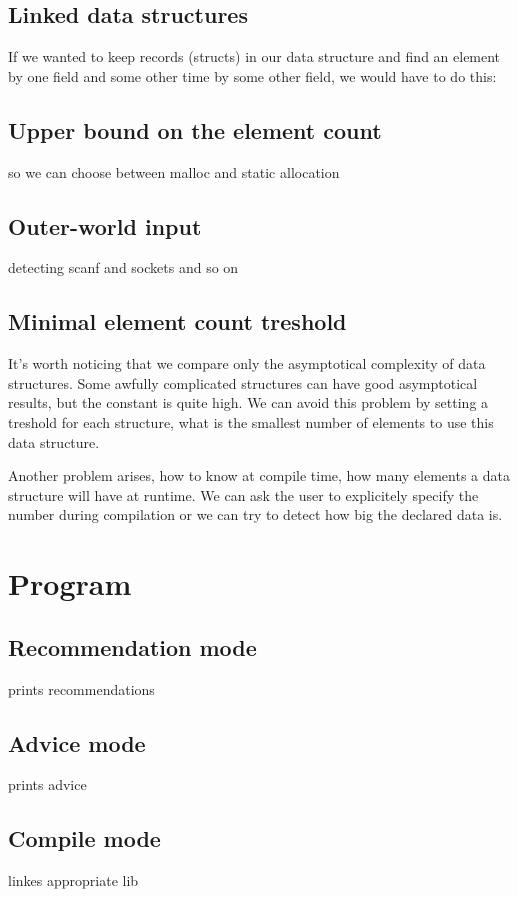 \documentclass[11pt]{article}
\begin{document}
	\subsection{Linked data structures}
		If we wanted to keep records (structs) in our data structure and find an element by one field and some other time by some other field, we would have to do this:
	\subsection{Upper bound on the element count}
		so we can choose between malloc and static allocation
	\subsection{Outer-world input}
		detecting scanf and sockets and so on
	\subsection{Minimal element count treshold}
		It's worth noticing that we compare only the asymptotical complexity of data structures. Some awfully complicated structures can have good asymptotical results, but the constant is quite high. We can avoid this problem by setting a treshold for each structure, what is the smallest number of elements to use this data structure.

		Another problem arises, how to know at compile time, how many elements a data structure will have at runtime. We can ask the user to explicitely specify the number during compilation or we can try to detect how big the declared data is.
\section{Program}
	\subsection{Recommendation mode}
		prints recommendations
	\subsection{Advice mode}
		prints advice
	\subsection{Compile mode}
		linkes appropriate lib
\end{document}
